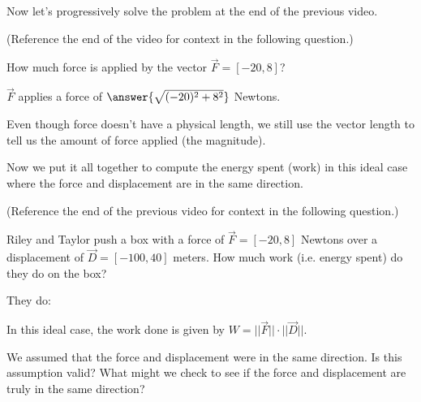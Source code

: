 \documentclass{ximera}
\begin{document}
Now let's progressively solve the problem at the end of the previous video.

\begin{problem}
    (Reference the end of the video for context in the following question.)

    How much force is applied by the vector $\vec{F}=[-20,8]$?

    $\vec{F}$ applies a force of $\answer{\sqrt{(-20)^2+8^2}}$ Newtons.

    \begin{feedback}
        Even though force doesn't have a physical length, we still use the vector length to tell us the amount of force applied (the magnitude).
    \end{feedback}
\end{problem}

Now we put it all together to compute the energy spent (work) in this ideal case where the force and displacement are in the same direction.


\begin{problem}
    (Reference the end of the previous video for context in the following question.)

    Riley and Taylor push a box with a force of $\vec{F}=[-20,8]$ Newtons over a displacement of $\vec{D}=[-100,40]$ meters. How much work (i.e. energy spent) do they do on the box?

    They do:

    \begin{multipleChoice}
    \end{multipleChoice}

    \begin{feedback}
        In this ideal case, the work done is given by $W=||\vec{F}||\cdot||\vec{D}||$.
    \end{feedback}

\end{problem}

We assumed that the force and displacement were in the same direction. Is this assumption valid? What might we check to see if the force and displacement are truly in the same direction?

\begin{center}
\end{center}
\end{document}
